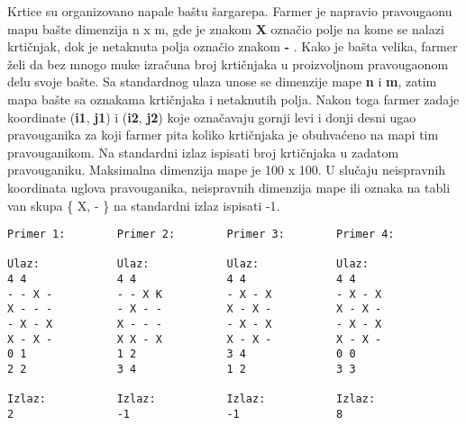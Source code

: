 \begin{Exercise}[label=v1.3_01] 
    Krtice su organizovano napale baštu šargarepa. Farmer je napravio
  pravougaonu mapu bašte dimenzija n x m, gde je znakom \textbf{X}
  označio polje na kome se nalazi krtičnjak, dok je netaknuta polja
  označio znakom \textbf{-} . Kako je bašta velika, farmer želi da bez
  mnogo muke izračuna broj krtičnjaka u proizvoljnom pravougaonom delu
  svoje bašte. Sa standardnog ulaza unose se dimenzije mape \textbf{n}
  i \textbf{m}, zatim mapa bašte sa oznakama krtičnjaka i netaknutih
  polja. Nakon toga farmer zadaje koordinate
  (\textbf{i1}, \textbf{j1}) i (\textbf{i2}, \textbf{j2}) koje
  označavaju gornji levi i donji desni ugao pravouganika za koji
  farmer pita koliko krtičnjaka je obuhvaćeno na mapi tim
  pravouganikom. Na standardni izlaz ispisati broj krtičnjaka u
  zadatom pravouganiku. Maksimalna dimenzija mape je 100 x 100. U
  slučaju neispravnih koordinata uglova pravouganika, neispravnih
  dimenzija mape ili oznaka na tabli van skupa \{ X, - \} na
  standardni izlaz ispisati -1.
     


\begin{center}
\begin{verbatim}
Primer 1:        Primer 2:        Primer 3:        Primer 4:  

Ulaz:            Ulaz:            Ulaz:            Ulaz:
4 4              4 4              4 4              4 4
- - X -          - - X K          - X - X          - X - X
X - - -          - X - -          X - X -          X - X -
- X - X          X - - -          - X - X          - X - X
X - X -          X X - X          X - X -          X - X -
0 1              1 2              3 4              0 0
2 2              3 4              1 2              3 3

Izlaz:           Izlaz:           Izlaz:           Izlaz:
2                -1               -1               8
\end{verbatim}
\end{center}
\end{Exercise}
\begin{Answer}[ref=v1.3_01]
\end{Answer}

